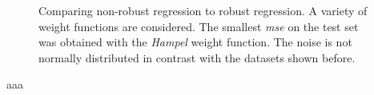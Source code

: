\begin{figure}[h]
\caption{Comparing non-robust regression to robust regression. A variety of weight functions are considered. The smallest \textit{mse} on the test set was obtained with the \textit{Hampel} weight function. The noise is not normally distributed in contrast with the datasets shown before.}
\label{robustsinc}
\end{figure}


aaa







